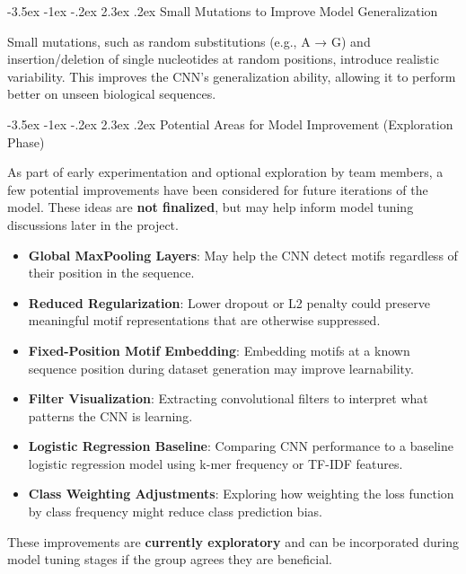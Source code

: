 \documentclass{report}
\makeatletter
\renewcommand\section{\@startsection{section}{1}{\z@}%
  {-3.5ex \@plus -1ex \@minus -.2ex}%
  {2.3ex \@plus.2ex}%
  {\normalfont\Large\bfseries}}
\providecommand{\tightlist}{%
  \setlength{\itemsep}{0pt}\setlength{\parskip}{0pt}}
\makeatother
\begin{document}
\section{Small Mutations to Improve Model
Generalization}\label{small-mutations-to-improve-model-generalization}

Small mutations, such as random substitutions (e.g., A → G) and
insertion/deletion of single nucleotides at random positions, introduce
realistic variability. This improves the CNN's generalization ability,
allowing it to perform better on unseen biological sequences.

\section{Potential Areas for Model Improvement (Exploration
Phase)}\label{potential-areas-for-model-improvement-exploration-phase}

As part of early experimentation and optional exploration by team
members, a few potential improvements have been considered for future
iterations of the model. These ideas are \textbf{not finalized}, but may
help inform model tuning discussions later in the project.

\begin{itemize}
\tightlist
\item
  \textbf{Global MaxPooling Layers}: May help the CNN detect motifs
  regardless of their position in the sequence.
\item
  \textbf{Reduced Regularization}: Lower dropout or L2 penalty could
  preserve meaningful motif representations that are otherwise
  suppressed.
\item
  \textbf{Fixed-Position Motif Embedding}: Embedding motifs at a known
  sequence position during dataset generation may improve learnability.
\item
  \textbf{Filter Visualization}: Extracting convolutional filters to
  interpret what patterns the CNN is learning.
\item
  \textbf{Logistic Regression Baseline}: Comparing CNN performance to a
  baseline logistic regression model using k-mer frequency or TF-IDF
  features.
\item
  \textbf{Class Weighting Adjustments}: Exploring how weighting the loss
  function by class frequency might reduce class prediction bias.
\end{itemize}

These improvements are \textbf{currently exploratory} and can be
incorporated during model tuning stages if the group agrees they are
beneficial.
\end{document}
